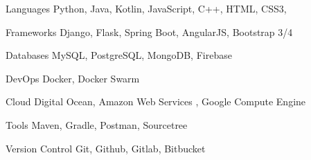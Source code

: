 

\begin{cvskills}


    \cvskill
    {Languages} %
    {Python, Java, Kotlin, JavaScript, C++, HTML, CSS3, } %

    \cvskill
    {Frameworks} %
    {Django, Flask, Spring Boot, AngularJS, Bootstrap 3/4} %


    \cvskill
    {Databases} %
    {MySQL, PostgreSQL, MongoDB, Firebase} %

    \cvskill
    {DevOps} %
    {Docker, Docker Swarm} %

    \cvskill
    {Cloud } %
    {Digital Ocean, Amazon Web Services , Google Compute Engine} %

    \cvskill
    {Tools} %
    {Maven, Gradle, Postman, Sourcetree} %

    \cvskill
    {Version Control} %
    {Git, Github, Gitlab, Bitbucket} %


\end{cvskills}
